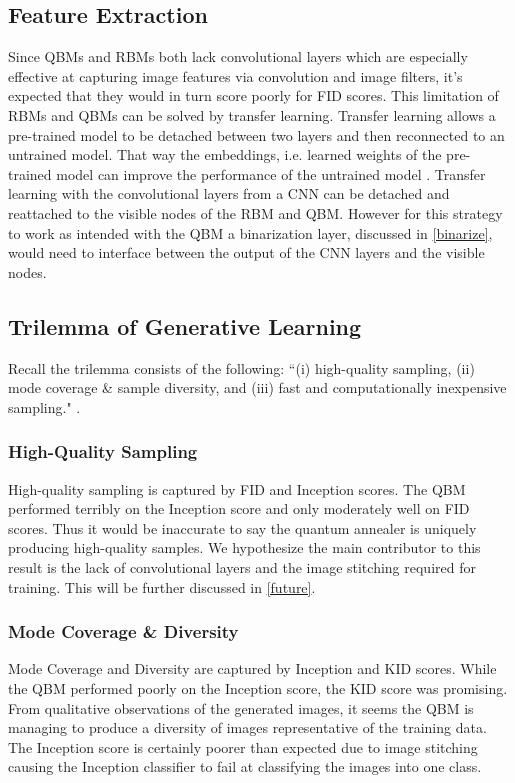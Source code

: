 \documentclass[%
 reprint,
 amsmath,amssymb,
 aps,
]{revtex4-2}
\begin{document}
\subsection{Feature Extraction}
Since QBMs and RBMs both lack convolutional layers which are especially effective at capturing image features via convolution and image filters, it's expected that they would in turn score poorly for FID scores. This limitation of RBMs and QBMs can be solved by transfer learning. Transfer learning allows a pre-trained model to be detached between two layers and then reconnected to an untrained model. That way the embeddings, i.e. learned weights of the pre-trained model can improve the performance of the untrained model \cite{transfer}. Transfer learning with the convolutional layers from a CNN can be detached and reattached to the visible nodes of the RBM and QBM. However for this strategy to work as intended with the QBM a binarization layer, discussed in \ref{binarize},  would need to interface between the output of the CNN layers and the visible nodes.


\subsection{Trilemma of Generative Learning}
Recall the trilemma consists of the following: ``(i) high-quality sampling, (ii) mode coverage \& sample diversity, and (iii) fast and computationally inexpensive sampling." \cite{xiao2022DDGAN}.

\subsubsection{High-Quality Sampling}
High-quality sampling is captured by FID and Inception scores. The QBM performed terribly on the Inception score and only moderately well on FID scores. Thus it would be inaccurate to say the quantum annealer is uniquely producing high-quality samples. We hypothesize the main contributor to this result is the lack of convolutional layers and the image stitching required for training. This will be further discussed in \ref{future}.

\subsubsection{Mode Coverage \& Diversity}
Mode Coverage and Diversity are captured by Inception and KID scores. While the QBM performed poorly on the Inception score, the KID score was promising. From qualitative observations of the generated images, it seems the QBM is managing to produce a diversity of images representative of the training data. The Inception score is certainly poorer than expected due to image stitching causing the Inception classifier to fail at classifying the images into one class.
\end{document}
